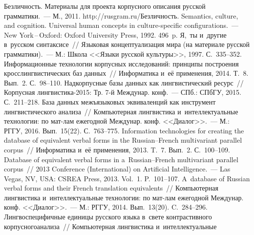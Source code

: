 \begin{multicols}{2}
{\small\frenchspacing
 {%
 \begin{thebibliography}{99}
 Безличность. Материалы для проекта корпусного описания русской 
грамматики.~--- М., 2011. {\sf http://rusgram.ru/Безличность}.
 Semantics, culture, and cognition. 
Universal human concepts in culture-specific configurations.~--- New York\,--\,Oxford: Oxford 
University Press, 1992. 496~p.
 Я,~ты и~другие в~русском синтаксисе~// Языковая 
концептуализация мира (на материале русской грамматики).~--- М.: Школа <<Языки 
русской культуры>>, 1997. С.~335--352.
 Инфор\-мационные технологии корпусных 
исследований: принципы построения кросслингвистических баз данных~// Информатика 
и~её применения, 2014. Т.~8. Вып.~2. С.~98--110.
 Надкорпусные 
базы данных как лингвистический ресурс~// Корпусная лингвистика-2015: Тр. 7-й 
Междунар. конф.~--- СПб.: СПбГУ, 2015. С.~211--218.
 База данных межъязыковых эквиваленций как инструмент 
лингвистического анализа~// Компьютерная лингвистика и~интеллектуальные 
технологии: по мат-лам ежегодной Междунар. конф. <<Диалог>>.~--- М.: РГГУ, 2016. 
Вып.~15(22). С.~763--775.
 Information technologies 
for creating the database of equivalent verbal forms in the Russian--French multivariant parallel 
corpus~// Информатика и~её применения, 2013. T.~7. Вып.~2. С.~100--109.
 Database 
of equivalent verbal forms in a~Russian--French multivariant parallel corpus~// 2013 Conference 
(International) on Artificial Intelligence.~--- Las Vegas, NV, USA: CSREA Press, 2013. 
Vol.~1. P.~101--107.
 A~database of Russian verbal forms and their French translation 
equivalents~// Компьютерная лингвистика и~интеллектуальные технологии: по мат-лам 
ежегодной Междунар. конф. <<Диалог>>.~--- М.: РГГУ, 2014. Вып.~13(20). C.~284--296.
 Лингвоспецифичные единицы русского языка в~свете 
контрастивного корпусного\linebreak анализа~// Компьютерная лингвистика и~интеллектуальные 

\end{thebibliography}}}
\end{multicols}
